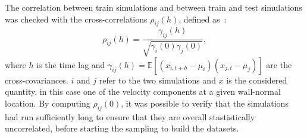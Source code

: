 The correlation between train simulations and between train and test simulations was checked with the cross-correlations $\rho_{ij}(h)$, defined as~\citep{makarashvili2017performance}:
\begin{equation}
    \rho_{ij}(h) = \frac{\gamma_{ij}(h)}{\sqrt{\gamma_{i}(0)\gamma_{j}(0)}},
\end{equation}
\noindent where $h$ is the time lag and $\gamma_{ij}(h)=\mathbb{E}[(x_{i,t+h}-\mu_i)(x_{j,t}-\mu_j)]$ are the cross-covariances. $i$ and $j$ refer to the two simulations and $x$ is the considered quantity, in this case one of the velocity components at a given wall-normal location.
By computing $\rho_{ij}(0)$, it was possible to verify that the simulations had run sufficiently long to ensure that they are overall stastistically uncorrelated, before starting the sampling to build the datasets.

